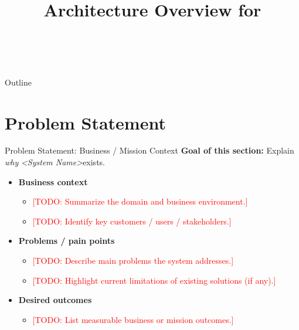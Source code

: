 \documentclass[aspectratio=169]{beamer}
\title[Architecture Overview]{Architecture Overview for \SystemName}
\subtitle{\ProjectName}
\author{\AuthorName}
\institute{\textit{<Organization / Team>}}
\date{\ReviewDate \\ \Version}
\newcommand{\SystemName}{\textit{<System Name>}}
\newcommand{\TODO}[1]{\textcolor{red}{[TODO: #1]}}
\begin{document}
\begin{frame}
  \titlepage
\end{frame}

\begin{frame}{Outline}
  \tableofcontents
\end{frame}

\section{Problem Statement}

\begin{frame}{Problem Statement: Business / Mission Context}
  \textbf{Goal of this section:} Explain \emph{why} \SystemName exists.

  \begin{itemize}
    \item \textbf{Business context}
      \begin{itemize}
        \item \TODO{Summarize the domain and business environment.}
        \item \TODO{Identify key customers / users / stakeholders.}
      \end{itemize}
    \item \textbf{Problems / pain points}
      \begin{itemize}
        \item \TODO{Describe main problems the system addresses.}
        \item \TODO{Highlight current limitations of existing solutions (if any).}
      \end{itemize}
    \item \textbf{Desired outcomes}
      \begin{itemize}
        \item \TODO{List measurable business or mission outcomes.}
      \end{itemize}
  \end{itemize}
\end{frame}
\end{document}
